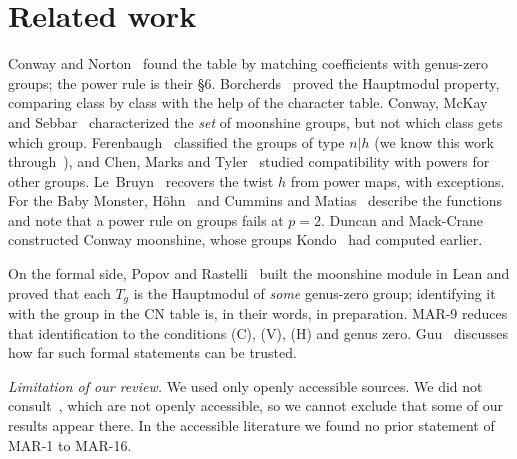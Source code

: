 \documentclass[11pt]{amsart}
\theoremstyle{definition}
\begin{document}
\section{Related work}\label{sec:lit}
Conway and Norton~\cite{CN79} found the table by matching coefficients with genus-zero groups; the power rule is their \S6. Borcherds~\cite{Bo92} proved the Hauptmodul property, comparing class by class with the help of the character table. Conway, McKay and Sebbar~\cite{CMS04} characterized the \emph{set} of moonshine groups, but not which class gets which group. Ferenbaugh~\cite{Fer} classified the groups of type $n|h$ (we know this work through~\cite{CMT}), and Chen, Marks and Tyler~\cite{CMT} studied compatibility with powers for other groups. Le~Bruyn~\cite{LeBruyn} recovers the twist $h$ from power maps, with exceptions. For the Baby Monster, H\"ohn~\cite{Hoehn03} and Cummins and Matias~\cite{CM18} describe the functions and note that a power rule on groups fails at $p=2$. Duncan and Mack-Crane~\cite{DMC15} constructed Conway moonshine, whose groups Kondo~\cite{Kondo85} had computed earlier.

On the formal side, Popov and Rastelli~\cite{PopovVOA} built the moonshine module in Lean and proved that each $T_g$ is the Hauptmodul of \emph{some} genus-zero group; identifying it with the group in the CN table is, in their words, in preparation. MAR-9 reduces that identification to the conditions (C), (V), (H) and genus zero. Guu~\cite{Guu26} discusses how far such formal statements can be trusted.

\emph{Limitation of our review.} We used only openly accessible sources. We did not consult~\cite{Norton84,FMN,Norton09,Cummins04,Fer,Gannon}, which are not openly accessible, so we cannot exclude that some of our results appear there. In the accessible literature we found no prior statement of MAR-1 to MAR-16.

\end{document}
